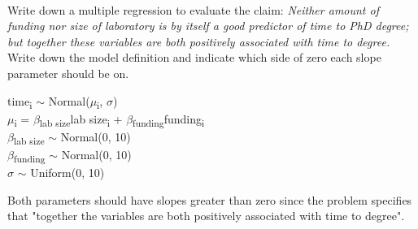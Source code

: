 \documentclass[12pt]{article}\usepackage[]{graphicx}\usepackage[]{color}
\newenvironment{problem}[2][Problem]{\begin{trivlist}
\item[\hskip \labelsep {\bfseries #1}\hskip \labelsep {\bfseries #2.}]}{\end{trivlist}}
\begin{document}
\begin{problem}{5E3}
\text{ }\\
Write down a multiple regression to evaluate the claim: \textit{Neither amount of funding nor size of laboratory is by itself a good predictor of time to PhD degree; but together these variables are both positively associated with time to degree.} Write down the model definition and indicate which side of zero each slope parameter should be on.
\end{problem}

\begin{center}
time\textsubscript{i} $\sim$ Normal($\mu$\textsubscript{i}, $\sigma$)\\
$\mu$\textsubscript{i} = $\beta$\textsubscript{lab size}lab size\textsubscript{i} + $\beta$\textsubscript{funding}funding\textsubscript{i}\\
$\beta$\textsubscript{lab size} $\sim$ Normal(0, 10)\\
$\beta$\textsubscript{funding} $\sim$ Normal(0, 10)\\
$\sigma$ $\sim$ Uniform(0, 10)
\end{center}

Both parameters should have slopes greater than zero since the problem specifies that "together the variables are both positively associated with time to degree".
\end{document}
